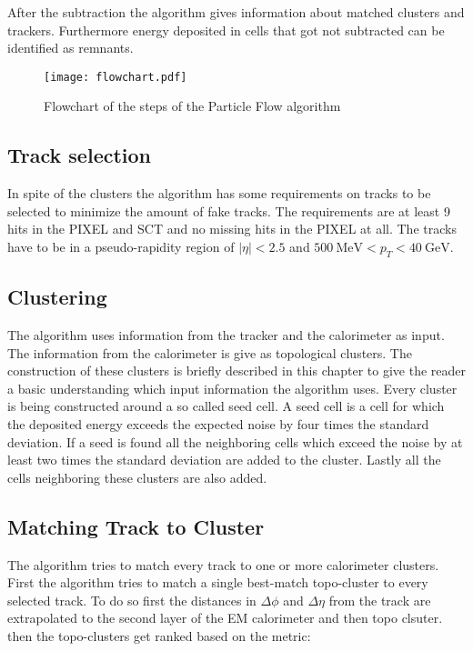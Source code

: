 After the subtraction the algorithm gives information about matched clusters and trackers. Furthermore energy deposited in cells that got not subtracted can be identified as remnants. 

\begin{figure}[h]
  \centering
  \texttt{[image: flowchart.pdf]}
  \caption[Flowchart of the steps of the Particle Flow algorithm]{Flowchart of the steps of the Particle Flow algorithm \cite{pflow16}}
  \label{fig:pflowflowchart}
\end{figure}

\subsection{Track selection}

In spite of the clusters the algorithm has some requirements on tracks to be selected to minimize the amount of fake tracks. The requirements are at least 9 hits in the PIXEL and SCT and no missing hits in the PIXEL at all. The tracks have to be in a pseudo-rapidity region of $|\eta|<2.5$ and $\SI{500}{\MeV}<p_T<\SI{40}{\GeV}$.




\subsection{Clustering}

The algorithm uses information from the tracker and the calorimeter as input. The information from the calorimeter is give as topological clusters. The construction of these clusters is briefly described in this chapter to give the reader a basic understanding which input information the algorithm uses.
Every cluster is being constructed around a so called seed cell. A seed cell is a cell for which the deposited energy exceeds the expected noise by four times the standard deviation. If a seed is found all the neighboring cells which exceed the noise by at least two times the standard deviation are added to the cluster. Lastly all the cells neighboring these clusters are also added.


\subsection{Matching Track to Cluster}

The algorithm tries to match every track to one or more calorimeter clusters. First the algorithm tries to match a single best-match topo-cluster to every selected track.
To do so first the distances in $\Delta \phi$ and $\Delta \eta$ from the track are extrapolated to the second layer of the EM calorimeter and then topo clsuter. then the topo-clusters get ranked based on the metric:

